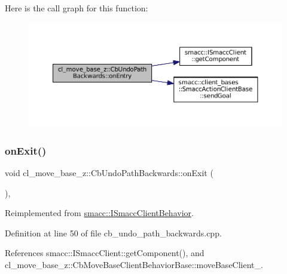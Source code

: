 Here is the call graph for this function\+:
\nopagebreak
\begin{figure}[H]
\begin{center}
\leavevmode
\includegraphics[width=350pt]{classcl__move__base__z_1_1CbUndoPathBackwards_a32e680530375b62c7053bf173f6b2b1b_cgraph}
\end{center}
\end{figure}
\mbox{\label{classcl__move__base__z_1_1CbUndoPathBackwards_a20cee921ad92db16f8d17c3c3b9c2daf}} 
\subsubsection{\texorpdfstring{on\+Exit()}{onExit()}}
{\footnotesize\ttfamily void cl\+\_\+move\+\_\+base\+\_\+z\+::\+Cb\+Undo\+Path\+Backwards\+::on\+Exit (\begin{DoxyParamCaption}{ }\end{DoxyParamCaption})\hspace{0.3cm}{\ttfamily [override]}, {\ttfamily [virtual]}}



Reimplemented from \hyperlink{classsmacc_1_1ISmaccClientBehavior_ad1198fdb2cbdf11f3276d3e23d4c0a50}{smacc\+::\+I\+Smacc\+Client\+Behavior}.



Definition at line 50 of file cb\+\_\+undo\+\_\+path\+\_\+backwards.\+cpp.



References smacc\+::\+I\+Smacc\+Client\+::get\+Component(), and cl\+\_\+move\+\_\+base\+\_\+z\+::\+Cb\+Move\+Base\+Client\+Behavior\+Base\+::move\+Base\+Client\+\_\+.


